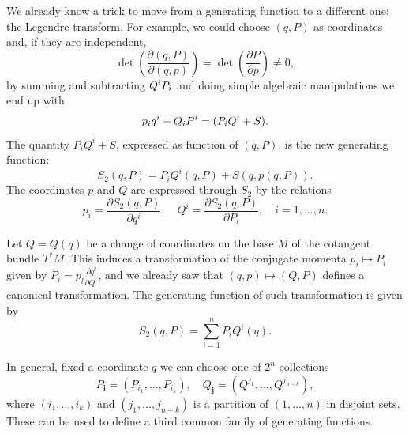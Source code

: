 \documentclass[english,fontsize=11pt,paper=a5,oneside]{scrbook}
\let\d\relax
\DeclareMathOperator{\d}{d}
\theoremstyle{definition}
\newenvironment{example}
  {\pushQED{\qed}\renewcommand{\qedsymbol}{$\lozenge$}\examplex}
  {\popQED\endexamplex}
\begin{document}
We already know a trick to move from a generating function to a different one: the Legendre transform.
For example, we could choose $(q,P)$ as coordinates and, if they are independent,
\begin{equation}
    \det\left( \frac{\partial(q,P)}{\partial(q,p)}\right) = \det\left( \frac{\partial P}{\partial p} \right)\neq 0,
\end{equation}
by summing and subtracting $Q^i\d P_i$ and doing simple algebraic manipulations we end up with
\begin{equation}
    p_i \d q^i + Q_i \d P^i = \d (P_iQ^i + S).
\end{equation}
The quantity $P_iQ^i + S$, expressed as function of $(q,P)$, is the new generating function:
\begin{equation}
    S_2(q,P) = P_i Q^i(q,P) + S(q, p(q,P)).
\end{equation}
The coordinates $p$ and $Q$ are expressed through $S_2$ by the relations
\begin{equation}\label{eq:coordgenfun2}
    p_i = \frac{\partial S_2(q,P)}{\partial q^i},\quad
    Q^i = \frac{\partial S_2(q,P)}{\partial P_i},\quad
    i=1,\ldots,n.
\end{equation}

\begin{example}
    Let $Q=Q(q)$ be a change of coordinates on the base $M$ of the cotangent bundle $T^*M$.
    This induces a transformation of the conjugate momenta $p_i\mapsto P_i$ given by $P_i = p_l \frac{\partial q^l}{\partial Q^i}$, and we already saw that $(q,p)\mapsto(Q,P)$ defines a canonical transformation.
    The generating function of such transformation is given by
    \begin{equation}
        S_2(q,P) = \sum_{i=1}^n P_i Q^i(q).
    \end{equation}
\end{example}

In general, fixed a coordinate $q$ we can choose one of $2^n$ collections
\begin{equation}\label{eq:PQcollection}
    P_{\bm{i}} = (P_{i_1}, \ldots, P_{i_k}), \quad
    Q_{\bm{j}} = (Q^{j_1}, \ldots, Q^{j_{n-k}}),
\end{equation}
where $(i_1, \ldots, i_k)$ and $(j_1, \ldots, j_{n-k})$ is a partition of $(1,\ldots,n)$ in disjoint sets.
These can be used to define a third common family of generating functions.
\end{document}

